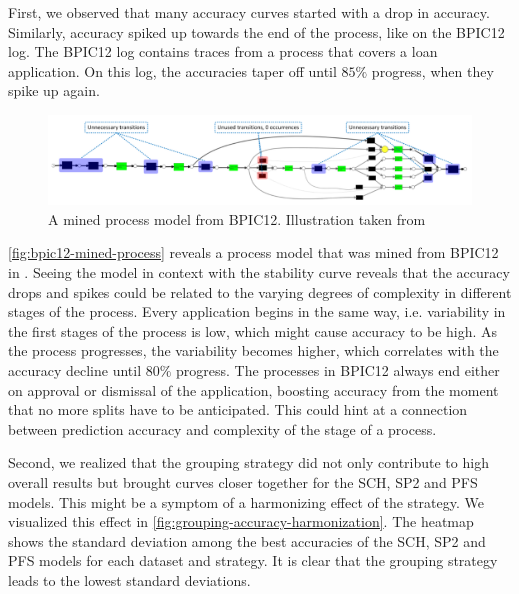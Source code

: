 First, we observed that many accuracy curves started with a drop in accuracy.
Similarly, accuracy spiked up towards the end of the process, like on the BPIC12 log.
The BPIC12 log contains traces from a process that covers a loan application.
On this log, the accuracies taper off until $85\%$ progress, when they spike up again.

\begin{figure}[!htb]
    \centering
    \begin{adjustbox}{center}
    \includegraphics[width=1.25\textwidth]{gfx/bpic12-mined-process.png}
    \end{adjustbox}
    \caption[A mined process model from BPIC12]{A mined process model from BPIC12. Illustration taken from~\cite{adriansyah2012mining}}
    \label{fig:bpic12-mined-process}
\end{figure}

\autoref{fig:bpic12-mined-process} reveals a process model that was mined from BPIC12 in \cite{adriansyah2012mining}.
Seeing the model in context with the stability curve reveals that the accuracy drops and spikes could be related to the varying degrees of complexity in different stages of the process.
Every application begins in the same way, i.e. variability in the first stages of the process is low, which might cause accuracy to be high.
As the process progresses, the variability becomes higher, which correlates with the accuracy decline until $80\%$ progress.
The processes in BPIC12 always end either on approval or dismissal of the application, boosting accuracy from the moment that no more splits have to be anticipated.
This could hint at a connection between prediction accuracy and complexity of the stage of a process.

Second, we realized that the grouping strategy did not only contribute to high overall results but brought curves closer together for the SCH, SP2 and PFS models.
This might be a symptom of a harmonizing effect of the strategy.
We visualized this effect in \autoref{fig:grouping-accuracy-harmonization}.
The heatmap shows the standard deviation among the best accuracies of the SCH, SP2 and PFS models for each dataset and strategy.
It is clear that the grouping strategy leads to the lowest standard deviations.

